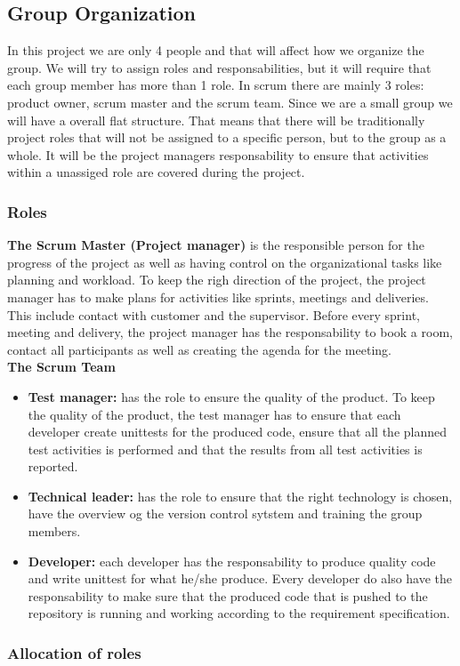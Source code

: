 \subsection{Group Organization}

In this project we are only 4 people and that will affect how we organize 
the group. We will try to assign roles and responsabilities, but it will
require that each group member has more than 1 role.
In scrum there are mainly 3 roles: product owner, scrum master and the
scrum team. Since we are a small group we will have a overall flat structure. That means that
there will be traditionally project roles that will not be assigned to a specific person, 
but to the group as a whole. It will be the project managers responsability to ensure 
that activities within a unassiged role are covered during the project.

\subsubsection{Roles}

{\bf The Scrum Master (Project manager)} is the responsible person for the progress of the project 
as well as having control on the organizational tasks like planning and workload.
To keep the righ direction of the project, the project manager has to make plans for 
activities like sprints, meetings and deliveries. This include contact with customer and the supervisor.
Before every sprint, meeting and delivery, the project manager has the responsability to book a room, contact all
participants as well as creating the agenda for the meeting. \\

\noindent
{\bf The Scrum Team}
\begin{itemize}

  \item {\bf Test manager:} has the role to ensure the quality of the product. To keep the quality 
  of the product, the test manager has to ensure that each developer create unittests for the 
  produced code, ensure that all the planned test activities is performed and that the results 
  from all test activities is reported.

  \item {\bf Technical leader:} has the role to ensure that the right technology is
  chosen, have the overview og the version control sytstem and training the group members.

  \item {\bf Developer:} each developer has the responsability to produce quality code
  and write unittest for what he/she produce. Every developer do also have the responsability
  to make sure that the produced code that is pushed to the repository is running and working
  according to the requirement specification.
  \end{itemize} 

\subsubsection{Allocation of roles}
